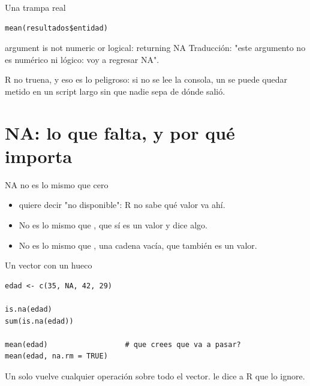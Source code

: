 \begin{frame}[fragile]{Una trampa real}
\begin{lstlisting}
mean(resultados$entidad)
\end{lstlisting}

  \vspace{0.6em}
  \begin{errorbox}{argument is not numeric or logical: returning NA}
    Traducción: "este argumento no es numérico ni lógico: voy a regresar
    NA".

    \vspace{0.5em}
    R no truena, y eso es lo peligroso: si no se lee la consola, un
     se puede quedar metido en un script largo sin que nadie sepa
    de dónde salió.
  \end{errorbox}
\end{frame}

\section{NA: lo que falta, y por qué importa}

\begin{frame}{NA no es lo mismo que cero}
  \vspace{0.3em}
  \begin{itemize}\setlength{\itemsep}{0.9em}
    \item<1->  quiere decir "no disponible": R no sabe qué valor va ahí.
    \item<2-> No es lo mismo que , que sí es un valor y dice algo.
    \item<3-> No es lo mismo que , una cadena vacía, que también es un valor.
  \end{itemize}

  \vspace{1.2em}
\end{frame}

\begin{frame}[fragile]{Un vector con un hueco}
\begin{lstlisting}
edad <- c(35, NA, 42, 29)

is.na(edad)
sum(is.na(edad))

mean(edad)                  # que crees que va a pasar?
mean(edad, na.rm = TRUE)
\end{lstlisting}

  \vspace{0.5em}
  {\small\color{grisTenue}Un solo  vuelve  cualquier
  operación sobre todo el vector.  le dice a R que lo
  ignore.}
\end{frame}

